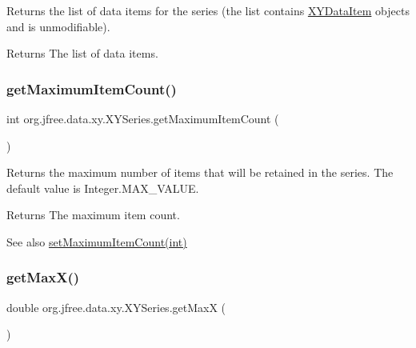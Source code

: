 Returns the list of data items for the series (the list contains \mbox{\hyperlink{classorg_1_1jfree_1_1data_1_1xy_1_1_x_y_data_item}{X\+Y\+Data\+Item}} objects and is unmodifiable).

\begin{DoxyReturn}{Returns}
The list of data items. 
\end{DoxyReturn}
\mbox{\label{classorg_1_1jfree_1_1data_1_1xy_1_1_x_y_series_a5bfd8c0b9c0dc7e27c030c742e372b49}} 
\subsubsection{\texorpdfstring{get\+Maximum\+Item\+Count()}{getMaximumItemCount()}}
{\footnotesize\ttfamily int org.\+jfree.\+data.\+xy.\+X\+Y\+Series.\+get\+Maximum\+Item\+Count (\begin{DoxyParamCaption}{ }\end{DoxyParamCaption})}

Returns the maximum number of items that will be retained in the series. The default value is {\ttfamily Integer.\+M\+A\+X\+\_\+\+V\+A\+L\+UE}.

\begin{DoxyReturn}{Returns}
The maximum item count.
\end{DoxyReturn}
\begin{DoxySeeAlso}{See also}
\mbox{\hyperlink{classorg_1_1jfree_1_1data_1_1xy_1_1_x_y_series_a523412c86de56ff2f9dc800dc65a9b2c}{set\+Maximum\+Item\+Count(int)}} 
\end{DoxySeeAlso}
\mbox{\label{classorg_1_1jfree_1_1data_1_1xy_1_1_x_y_series_a1fd6e9dd33f4e78955e2ead151cbf43f}} 
\subsubsection{\texorpdfstring{get\+Max\+X()}{getMaxX()}}
{\footnotesize\ttfamily double org.\+jfree.\+data.\+xy.\+X\+Y\+Series.\+get\+MaxX (\begin{DoxyParamCaption}{ }\end{DoxyParamCaption})}

